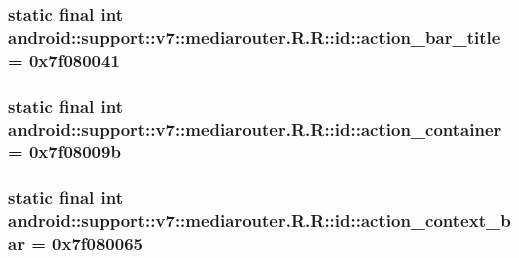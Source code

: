 \hypertarget{classandroid_1_1support_1_1v7_1_1mediarouter_1_1_r_1_1id_816055351a5c979328ba160ff9b927ad}{
\subsubsection[{action\_\-bar\_\-title}]{\setlength{\rightskip}{0pt plus 5cm}static final int android::support::v7::mediarouter.R.R::id::action\_\-bar\_\-title = 0x7f080041}}
\label{classandroid_1_1support_1_1v7_1_1mediarouter_1_1_r_1_1id_816055351a5c979328ba160ff9b927ad}


\hypertarget{classandroid_1_1support_1_1v7_1_1mediarouter_1_1_r_1_1id_0f2a739d0a087c42ab5ca27744243818}{
\subsubsection[{action\_\-container}]{\setlength{\rightskip}{0pt plus 5cm}static final int android::support::v7::mediarouter.R.R::id::action\_\-container = 0x7f08009b}}
\label{classandroid_1_1support_1_1v7_1_1mediarouter_1_1_r_1_1id_0f2a739d0a087c42ab5ca27744243818}


\hypertarget{classandroid_1_1support_1_1v7_1_1mediarouter_1_1_r_1_1id_291d607ed0e30687593ed8ddc6d289e4}{
\subsubsection[{action\_\-context\_\-bar}]{\setlength{\rightskip}{0pt plus 5cm}static final int android::support::v7::mediarouter.R.R::id::action\_\-context\_\-bar = 0x7f080065}}
\label{classandroid_1_1support_1_1v7_1_1mediarouter_1_1_r_1_1id_291d607ed0e30687593ed8ddc6d289e4}



